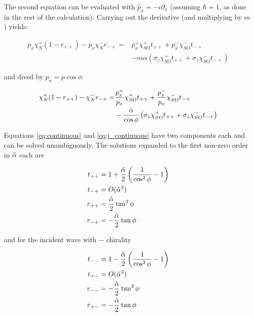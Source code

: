 The second equation can be evaluated with $\hat p_x = -i \partial_x$
(assuming $\hbar = 1$, as done in the rest of the calculation).
Carrying out the derivative (and multiplying by $m$) yields:

\begin{align}
    p_x \chi_N^+ (1 - r_{++}) - p_x \chi_N^- r_{-+}
        =& p_x^+ \chi_{SO}^+ t_{++} + p_x^- \chi_{SO}^- t_{-+} \nonumber\\
         &   - m \alpha \left(  \sigma_z \chi_{SO}^+ t_{++}
                            + \sigma_z \chi_{SO}^- t_{-+} \right)
\end{align}

and dived by  $p_x = p \cos \phi$: 

\begin{align}
    \chi_N^+ (1 - r_{++}) - \chi_N^- r_{-+}
        =& \frac{p_x^+}{p_x} \chi_{SO}^+ t_{++} + \frac{p_x^-}{p_x} \chi_{SO}^- t_{-+} \nonumber\\
         &   - \frac{\tilde \alpha}{\cos \phi} \left(\sigma_z \chi_{SO}^+
                 t_{++} + \sigma_z \chi_{SO}^- t_{-+} \right)
                                \label{eq:j_continuous}
\end{align}

Equations \ref{eq:continuous} and \ref{eq:j_continuous} have two
components each and can be solved unambiguously. 
The solutions expanded to the first non-zero order in $\tilde \alpha$ each are

\begin{align}
    t_{++} &= 1 +
            \frac{\tilde \alpha}{2}\left( \frac{1}{\cos^2\phi} - 1 \right)\\
    t_{-+} &= O(\tilde \alpha^3)\\
    r_{++} &= \frac{\tilde \alpha}{2} \tan^2 \phi\\
    r_{-+} &= -\frac{\tilde \alpha}{2} \tan \phi
\end{align}

and for the incident wave with $-$ chirality

\begin{align}
    t_{--} &= 1 - \frac{\tilde \alpha}{2} \left( \frac{1}{\cos^2\phi} - 1 \right)\\
    t_{+-} &= O(\tilde \alpha^3)\\
    r_{--} &= -\frac{\tilde \alpha}{2} \tan^2 \phi\\
    r_{+-} &= -\frac{\tilde \alpha}{2} \tan \phi
\end{align}

